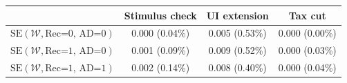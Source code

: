 \begin{tabular}{@{}lccc@{}}
\toprule
                          & Stimulus check      & UI extension    & Tax cut    \\  \midrule
$\mathrm{SE}(\mathcal{W}, \text{Rec=0, AD=0})$ & 0.000 (0.04\%)  & 0.005 (0.53\%)  & 0.000 (0.00\%)     \\
$\mathrm{SE}(\mathcal{W}, \text{Rec=1, AD=0})$ & 0.001 (0.09\%)  & 0.009 (0.52\%)  & 0.000 (0.03\%)     \\
$\mathrm{SE}(\mathcal{W}, \text{Rec=1, AD=1})$ & 0.002 (0.14\%)  & 0.008 (0.40\%)  & 0.000 (0.04\%)     \\ \bottomrule
\end{tabular}
